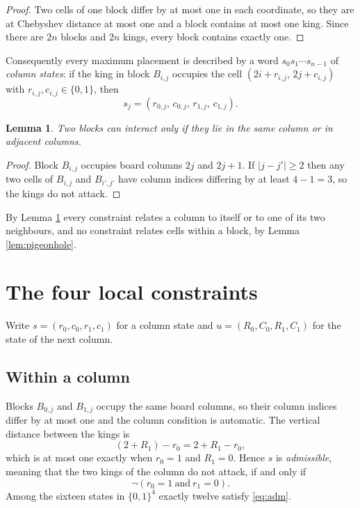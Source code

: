 \documentclass[12pt]{article}
\newtheorem{lemma}[theorem]{Lemma}
\theoremstyle{definition}
\begin{document}
\begin{proof}
Two cells of one block differ by at most one in each coordinate, so they are at
Chebyshev distance at most one and a block contains at most one king. Since
there are $2n$ blocks and $2n$ kings, every block contains exactly one.
\end{proof}

Consequently every maximum placement is described by a word
$s_0 s_1 \cdots s_{n-1}$ of \emph{column states}: if the king in block $B_{i,j}$
occupies the cell $(2i + r_{i,j},\, 2j + c_{i,j})$ with $r_{i,j}, c_{i,j} \in
\{0,1\}$, then
\[
s_j = (r_{0,j},\, c_{0,j},\, r_{1,j},\, c_{1,j}).
\]

\begin{lemma}
\label{lem:locality}
Two blocks can interact only if they lie in the same column or in adjacent
columns.
\end{lemma}

\begin{proof}
Block $B_{i,j}$ occupies board columns $2j$ and $2j+1$. If $|j - j'| \ge 2$
then any two cells of $B_{i,j}$ and $B_{i',j'}$ have column indices differing
by at least $4 - 1 = 3$, so the kings do not attack.
\end{proof}

By Lemma \ref{lem:locality} every constraint relates a column to itself or to
one of its two neighbours, and no constraint relates cells within a block,
by Lemma \ref{lem:pigeonhole}.

\section{The four local constraints}

Write $s = (r_0, c_0, r_1, c_1)$ for a column state and $u = (R_0, C_0, R_1,
C_1)$ for the state of the next column.

\subsection{Within a column}

Blocks $B_{0,j}$ and $B_{1,j}$ occupy the same board columns, so their column
indices differ by at most one and the column condition is automatic. The
vertical distance between the kings is
\[
(2 + R_1) - r_0 = 2 + R_1 - r_0,
\]
which is at most one exactly when $r_0 = 1$ and $R_1 = 0$. Hence $s$ is
\emph{admissible}, meaning that the two kings of the column do not attack, if
and only if
\begin{equation}
\label{eq:adm}
\neg (r_0 = 1 \ \text{and}\ r_1 = 0).
\end{equation}
Among the sixteen states in $\{0,1\}^4$ exactly twelve satisfy \eqref{eq:adm}.
\end{document}
